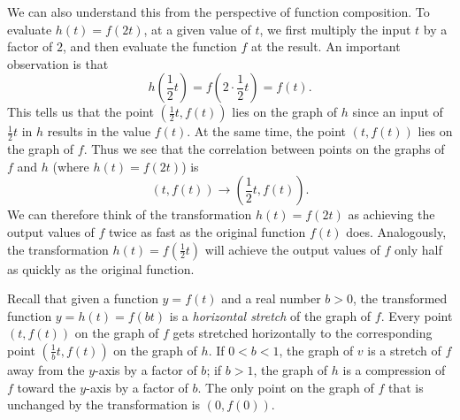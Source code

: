 \documentclass{ximera}
\begin{document}
We can also understand this from the perspective of function composition.  To evaluate \(h(t) = f(2t)\), at a given value of \(t\), we first multiply the input \(t\) by a factor of \(2\), and then evaluate the function \(f\) at the result.  An important observation is that%
\[
h\left( \frac{1}{2}t \right) = f\left( 2 \cdot \frac{1}{2}t \right) = f(t)\text{.}
\]
This tells us that the point \(\left(\frac{1}{2}t, f(t)\right)\) lies on the graph of \(h\) since an input of \(\frac{1}{2}t\) in \(h\) results in the value \(f(t)\).  At the same time, the point \((t,f(t))\) lies on the graph of \(f\).  Thus we see that the correlation between points on the graphs of \(f\) and \(h\) (where \(h(t) = f(2t)\)) is%
\[
(t, f(t)) \rightarrow \left( \frac{1}{2}t, f(t) \right)\text{.}
\]
We can therefore think of the transformation \(h(t) = f(2t)\) as achieving the output values of \(f\) twice as fast as the original function \(f(t)\) does.  Analogously, the transformation \(h(t) = f\left(\frac{1}{2}t\right)\) will achieve the output values of \(f\) only half as quickly as the original function.%

Recall that given a function \(y = f(t)\) and a real number \(b > 0\), the transformed function \(y = h(t) = f(bt)\) is a \emph{horizontal stretch} of the graph of \(f\).  Every point \((t,f(t))\) on the graph of \(f\) gets stretched horizontally to the corresponding point \(\left(\frac{1}{b}t,f(t)\right)\) on the graph of \(h\).  If \(0 < b < 1\), the graph of \(v\) is a stretch of \(f\) away from the \(y\)-axis by a factor of \(b\); if \(b > 1\), the graph of \(h\) is a compression of \(f\) toward the \(y\)-axis by a factor of \(b\).  The only point on the graph of \(f\) that is unchanged by the transformation is \((0,f(0))\).%
\end{document}
